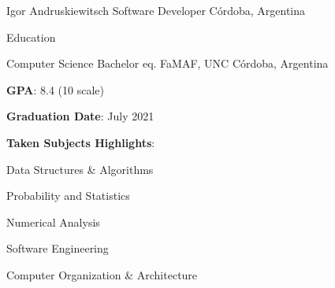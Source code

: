 \documentclass{curriculum}
\begin{document}

\begin{cvheader}

\makeheader
    {Igor Andruskiewitsch}  {}
    {Software Developer}    {}
    {Córdoba, Argentina}    {}

\end{cvheader}


\begin{cvsection}{Education}

    \makesectionitemheader
        {Computer Science Bachelor eq.}       {FaMAF, UNC}
        {}                                    {Córdoba, Argentina}

        \begin{sectionitemlist}

        \item {
            \textbf{GPA}: 8.4 (10 scale)
        }
        \item {
            \textbf{Graduation Date}: July 2021
        }
        \item {
            \textbf{Taken Subjects Highlights}:
        }
        {
            \begin{colsectionitemlist}{3}
                \item{Data Structures \& Algorithms}
                \item{Probability and Statistics}
                \item{Numerical Analysis}
                \item{Software Engineering}
                \item{Computer Organization \& Architecture}
            \end{colsectionitemlist}
        }

        \end{sectionitemlist}

\end{cvsection}

\end{document}
